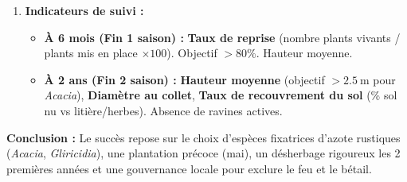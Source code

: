 \documentclass[11pt]{article}
\begin{document}
\begin{exoresolu}
\begin{enumerate}
\begin{itemize}
                  \item \textbf{Contrat social / Gestion communautaire :} Accord avec éleveurs (chefs traditionnels) : interdiction pâturage 3 ans contre droit de coupe herbe/foin sur pare-feu ou jachères voisines. Gardien unique payé par village (moins cher que clôture).
              \end{itemize}
        \item \textbf{Indicateurs de suivi :}
              \begin{itemize}
                  \item \textbf{À 6 mois (Fin 1 saison) :} \textbf{Taux de reprise} (nombre plants vivants / plants mis en place $\times 100$). Objectif $> 80\%$. Hauteur moyenne.
                  \item \textbf{À 2 ans (Fin 2 saison) :} \textbf{Hauteur moyenne} (objectif $> \SI{2,5}{\m}$ pour \emph{Acacia}), \textbf{Diamètre au collet}, \textbf{Taux de recouvrement du sol} (\% sol nu vs litière/herbes). Absence de ravines actives.
              \end{itemize}
    \end{enumerate}
    \textbf{Conclusion :} Le succès repose sur le choix d'espèces fixatrices d'azote rustiques (\emph{Acacia}, \emph{Gliricidia}), une plantation précoce (mai), un désherbage rigoureux les 2 premières années et une gouvernance locale pour exclure le feu et le bétail.
\end{exoresolu}
\end{document}
